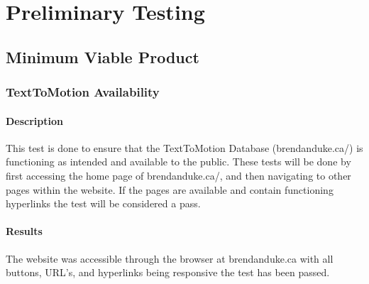 \documentclass{scrreprt}
\begin{document}
\chapter{Preliminary Testing}

\section{Minimum Viable Product}
\subsection{TextToMotion Availability}

\subsubsection{Description}

This test is done to ensure that the TextToMotion Database (brendanduke.ca/) is functioning as intended and available to the public. These tests will be done by first accessing the home page of brendanduke.ca/, and then navigating to other pages within the website. If the pages are available and contain functioning hyperlinks the test will be considered a pass.

\subsubsection{Results}

The website was accessible through the browser at brendanduke.ca with all buttons, URL's, and hyperlinks being responsive the test has been passed.
\end{document}

